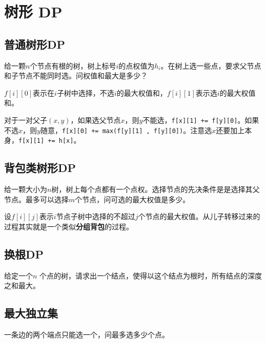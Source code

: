 \section{树形 DP}

\subsection{普通树形DP}

\begin{framed}
    给一颗$n$个节点有根的树，树上标号$i$的点权值为$h_i$。在树上选一些点，要求父节点和子节点不能同时选。问权值和最大是多少？
\end{framed}

$f[i][0]$表示在$i$子树中选择，不选$i$的最大权值和，$f[i][1]$表示选$i$的最大权值和。

对于一对父子$(x,y)$，如果选父节点$x$，则$y$不能选，\verb|f[x][1] += f[y][0]|。如果不选$x$，则$y$随意，\verb|f[x][0] += max(f[y][1] , f[y][0])|。注意选$x$还要加上本身，\verb|f[x][1] += h[x]|。



\subsection{背包类树形DP}

\begin{framed}
    给一颗大小为$n$树，树上每个点都有一个点权。选择节点的先决条件是是选择其父节点。最多可以选择$m$个节点，问可选的最大权值是多少。
\end{framed}

设$f[i][j]$表示$i$节点子树中选择的不超过$j$个节点的最大权值。从儿子转移过来的过程其实就是一个类似\textbf{分组背包}的过程。



\subsection{换根DP}

\begin{framed}
    给定一个$n$ 个点的树，请求出一个结点，使得以这个结点为根时，所有结点的深度之和最大。
\end{framed}



\subsection{最大独立集}
一条边的两个端点只能选一个，问最多选多少个点。


